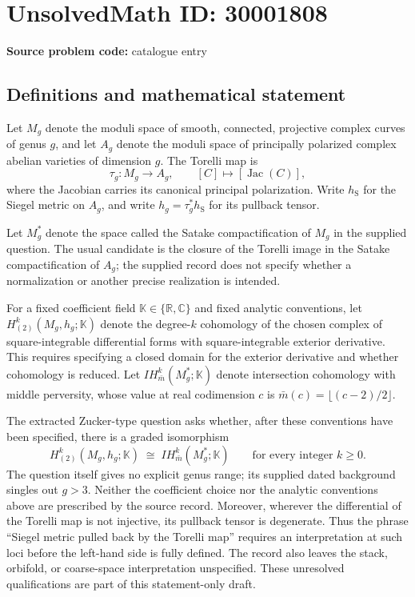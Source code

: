 \documentclass[11pt]{article}
\newcommand{\R}{\mathbb{R}}
\newcommand{\C}{\mathbb{C}}
\begin{document}
\section*{UnsolvedMath ID: 30001808}
\textbf{Source problem code:} catalogue entry
\subsection{Definitions and mathematical statement}
Let \(M_g\) denote the moduli space of smooth, connected, projective complex curves of genus \(g\), and let \(A_g\) denote the moduli space of principally polarized complex abelian varieties of dimension \(g\). The Torelli map is
\[
\tau_g:M_g\longrightarrow A_g,\qquad [C]\longmapsto [\operatorname{Jac}(C)],
\]
where the Jacobian carries its canonical principal polarization. Write \(h_{\mathrm S}\) for the Siegel metric on \(A_g\), and write \(h_g=\tau_g^*h_{\mathrm S}\) for its pullback tensor.

Let \(M_g^*\) denote the space called the Satake compactification of \(M_g\) in the supplied question. The usual candidate is the closure of the Torelli image in the Satake compactification of \(A_g\); the supplied record does not specify whether a normalization or another precise realization is intended.

For a fixed coefficient field \(\mathbb K\in\{\R,\C\}\) and fixed analytic conventions, let \(H_{(2)}^k(M_g,h_g;\mathbb K)\) denote the degree-\(k\) cohomology of the chosen complex of square-integrable differential forms with square-integrable exterior derivative. This requires specifying a closed domain for the exterior derivative and whether cohomology is reduced. Let \(IH_{\bar m}^k(M_g^*;\mathbb K)\) denote intersection cohomology with middle perversity, whose value at real codimension \(c\) is \(\bar m(c)=\lfloor(c-2)/2\rfloor\).

The extracted Zucker-type question asks whether, after these conventions have been specified, there is a graded isomorphism
\[
H_{(2)}^k(M_g,h_g;\mathbb K)
\;\cong\;
IH_{\bar m}^k(M_g^*;\mathbb K)
\qquad\text{for every integer }k\geq 0.
\]
The question itself gives no explicit genus range; its supplied dated background singles out \(g>3\). Neither the coefficient choice nor the analytic conventions above are prescribed by the source record. Moreover, wherever the differential of the Torelli map is not injective, its pullback tensor is degenerate. Thus the phrase ``Siegel metric pulled back by the Torelli map'' requires an interpretation at such loci before the left-hand side is fully defined. The record also leaves the stack, orbifold, or coarse-space interpretation unspecified. These unresolved qualifications are part of this statement-only draft.
\end{document}
